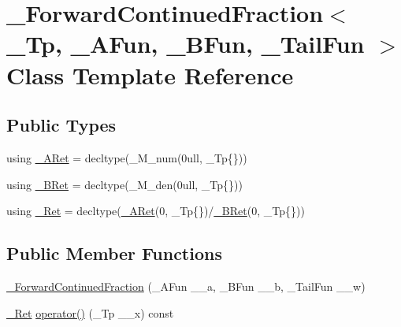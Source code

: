 \hypertarget{class__ForwardContinuedFraction}{}\section{\+\_\+\+Forward\+Continued\+Fraction$<$ \+\_\+\+Tp, \+\_\+\+A\+Fun, \+\_\+\+B\+Fun, \+\_\+\+Tail\+Fun $>$ Class Template Reference}
\label{class__ForwardContinuedFraction}
\subsection*{Public Types}
\begin{DoxyCompactItemize}
\item 
using \hyperlink{class__ForwardContinuedFraction_aa3cd354821d01eff12c24f0c4283b6ee}{\+\_\+\+A\+Ret} = decltype(\+\_\+\+M\+\_\+num(0ull, \+\_\+\+Tp\{\}))
\item 
using \hyperlink{class__ForwardContinuedFraction_a0353d4790204b04fca698a26fa9a7d0b}{\+\_\+\+B\+Ret} = decltype(\+\_\+\+M\+\_\+den(0ull, \+\_\+\+Tp\{\}))
\item 
using \hyperlink{class__ForwardContinuedFraction_ab67bebe1ce3d9ab53ac76024af1b2007}{\+\_\+\+Ret} = decltype(\hyperlink{class__ForwardContinuedFraction_aa3cd354821d01eff12c24f0c4283b6ee}{\+\_\+\+A\+Ret}(0, \+\_\+\+Tp\{\})/\hyperlink{class__ForwardContinuedFraction_a0353d4790204b04fca698a26fa9a7d0b}{\+\_\+\+B\+Ret}(0, \+\_\+\+Tp\{\}))
\end{DoxyCompactItemize}
\subsection*{Public Member Functions}
\begin{DoxyCompactItemize}
\item 
\hyperlink{class__ForwardContinuedFraction_a0337894d9199abad9dbbfba007cf3dbd}{\+\_\+\+Forward\+Continued\+Fraction} (\+\_\+\+A\+Fun \+\_\+\+\_\+a, \+\_\+\+B\+Fun \+\_\+\+\_\+b, \+\_\+\+Tail\+Fun \+\_\+\+\_\+w)
\item 
\hyperlink{class__ForwardContinuedFraction_ab67bebe1ce3d9ab53ac76024af1b2007}{\+\_\+\+Ret} \hyperlink{class__ForwardContinuedFraction_a6fb6032d848099b493b23b8453fcb5e1}{operator()} (\+\_\+\+Tp \+\_\+\+\_\+x) const
\end{DoxyCompactItemize}


